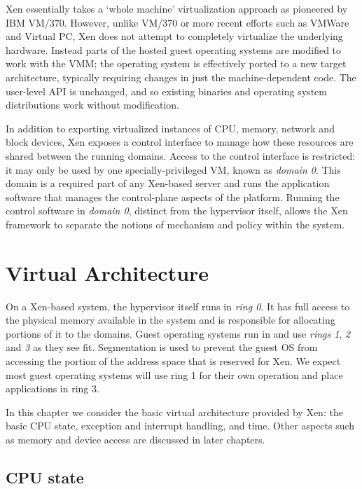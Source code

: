 \documentclass[11pt,twoside,final,openright]{report}
\begin{document}
Xen essentially takes a `whole machine' virtualization approach as
pioneered by IBM VM/370.  However, unlike VM/370 or more recent
efforts such as VMWare and Virtual PC, Xen does not attempt to
completely virtualize the underlying hardware.  Instead parts of the
hosted guest operating systems are modified to work with the VMM; the
operating system is effectively ported to a new target architecture,
typically requiring changes in just the machine-dependent code.  The
user-level API is unchanged, and so existing binaries and operating
system distributions work without modification.

In addition to exporting virtualized instances of CPU, memory, network
and block devices, Xen exposes a control interface to manage how these
resources are shared between the running domains. Access to the
control interface is restricted: it may only be used by one
specially-privileged VM, known as {\em domain 0}.  This domain is a
required part of any Xen-based server and runs the application software
that manages the control-plane aspects of the platform.  Running the
control software in {\it domain 0}, distinct from the hypervisor
itself, allows the Xen framework to separate the notions of 
mechanism and policy within the system.



\chapter{Virtual Architecture}

On a Xen-based system, the hypervisor itself runs in {\it ring 0}.  It
has full access to the physical memory available in the system and is
responsible for allocating portions of it to the domains.  Guest
operating systems run in and use {\it rings 1}, {\it 2} and {\it 3} as
they see fit. Segmentation is used to prevent the guest OS from
accessing the portion of the address space that is reserved for
Xen. We expect most guest operating systems will use ring 1 for their
own operation and place applications in ring 3.

In this chapter we consider the basic virtual architecture provided 
by Xen: the basic CPU state, exception and interrupt handling, and
time. Other aspects such as memory and device access are discussed 
in later chapters. 

\section{CPU state}
\end{document}
